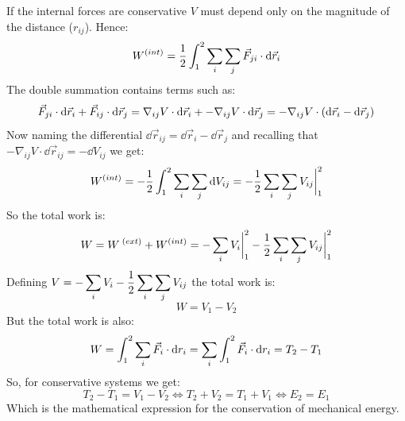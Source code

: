 If the internal forces are conservative $V$ must depend only on the magnitude of the distance ($r_{ij}$). Hence:
\begin{equation}
    W^{(int)}=\dfrac{1}{2}\int_{1}^{2}\displaystyle\sum_i\displaystyle\sum_j\vec{F}_{ji}\cdot\dd{\vec{r}_i}
\end{equation}
The double summation contains terms such as:
\begin{equation}
    \vec{F}_{ji}\cdot\dd{\vec{r}_i} + \vec{F}_{ij}\cdot\dd{\vec{r}_j} = \nabla_{ij}V\cdot\dd{\vec{r}_i} + -\nabla_{ij}V\cdot\dd{\vec{r}_j} = -\nabla_{ij}V\cdot\left(\dd{\vec{r}_i}-\dd{\vec{r}_j}\right)
\end{equation}
Now naming the differential $\dd{\vec{r}_{ij}}=\dd{\vec{r}_i}-\dd{\vec{r}_j}$ and recalling that $-\nabla_{ij}V\cdot\dd{\vec{r}_{ij}} = -\dd{V_{ij}}$ we get:
\begin{equation}
    W^{(int)}=-\dfrac{1}{2}\int_{1}^{2}\displaystyle\sum_i\displaystyle\sum_j\dd{V_{ij}} = -\dfrac{1}{2}\displaystyle\sum_i\displaystyle\sum_j V_{ij}\bigg|_{1}^{2}
\end{equation}
So the total work is:
\begin{equation}
    W = W^{\;(ext)}+W^{(int)}= -\displaystyle\sum_i V_i\bigg|_{1}^{2} -\dfrac{1}{2}\displaystyle\sum_i\displaystyle\sum_j V_{ij}\bigg|_{1}^{2}
\end{equation}
Defining $V=-\displaystyle\sum_i V_i -\dfrac{1}{2}\displaystyle\sum_i\displaystyle\sum_j V_{ij}$ the total work is:
\begin{equation}
    W = V_1-V_2
\end{equation}
But the total work is also:
\begin{equation}
    W = \int_{1}^{2}\displaystyle\sum_i \vec{F}_i \cdot \dd{r_i}= \displaystyle\sum_i \int_{1}^{2} \vec{F}_i \cdot \dd{r_i} = T_2 - T_1
\end{equation}
So, for conservative systems we get:
\begin{equation}
    T_2 - T_1 = V_1 - V_2 \iff T_2 + V_2 = T_1 + V_1 \iff E_2 = E_1
\end{equation}
Which is the mathematical expression for the conservation of mechanical energy.
